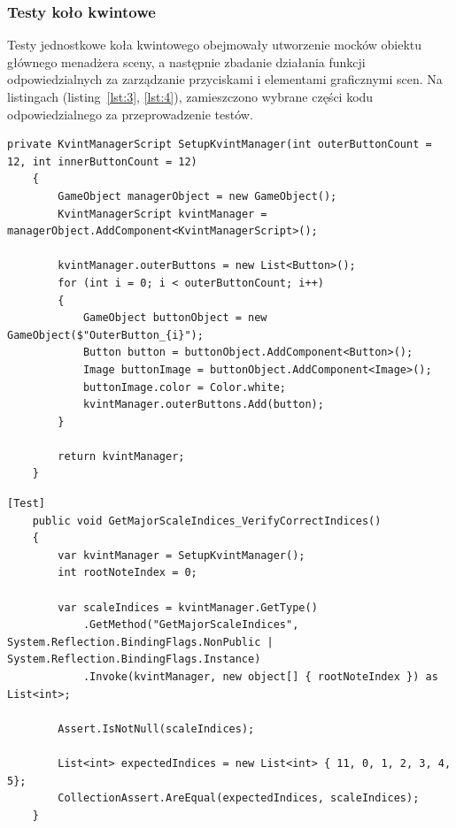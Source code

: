 \subsubsection{Testy koło kwintowe}

Testy jednostkowe koła kwintowego obejmowały utworzenie mocków obiektu głównego menadżera sceny, a następnie zbadanie działania funkcji odpowiedzialnych za zarządzanie przyciskami i elementami graficznymi scen. Na listingach (listing~\ref{lst:3}, \ref{lst:4}), zamieszczono wybrane części kodu odpowiedzialnego za przeprowadzenie testów.

\begin{lstlisting}[style=sharpcstyle,caption=Funkcja \texttt{SetupKvintManager}, label=lst:3]
    private KvintManagerScript SetupKvintManager(int outerButtonCount = 12, int innerButtonCount = 12)
    {
        GameObject managerObject = new GameObject();
        KvintManagerScript kvintManager = managerObject.AddComponent<KvintManagerScript>();
        
        kvintManager.outerButtons = new List<Button>();
        for (int i = 0; i < outerButtonCount; i++)
        {
            GameObject buttonObject = new GameObject($"OuterButton_{i}");
            Button button = buttonObject.AddComponent<Button>();
            Image buttonImage = buttonObject.AddComponent<Image>();
            buttonImage.color = Color.white;
            kvintManager.outerButtons.Add(button);
        }

        return kvintManager;
    }  
\end{lstlisting}

\begin{lstlisting}[style=sharpcstyle,caption=Funkcja \texttt{GetMajorScaleIndices\_VerifyCorrectIndices}, label=lst:4]
    [Test]
    public void GetMajorScaleIndices_VerifyCorrectIndices()
    {
        var kvintManager = SetupKvintManager();
        int rootNoteIndex = 0;

        var scaleIndices = kvintManager.GetType()
            .GetMethod("GetMajorScaleIndices", System.Reflection.BindingFlags.NonPublic | System.Reflection.BindingFlags.Instance)
            .Invoke(kvintManager, new object[] { rootNoteIndex }) as List<int>;

        Assert.IsNotNull(scaleIndices);
        
        List<int> expectedIndices = new List<int> { 11, 0, 1, 2, 3, 4, 5};
        CollectionAssert.AreEqual(expectedIndices, scaleIndices);
    }
\end{lstlisting}

